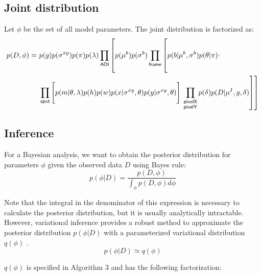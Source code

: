 \subsection*{Joint distribution}

Let $\phi$ be the set of all model parameters. The joint distribution is factorized as:
%
\begin{equation}
\begin{aligned}
    p(D, \phi) =~&p(g) p(\sigma^{xy}) p(\pi) p(\lambda) \prod_{\mathsf{AOI}} \left[ p(\mu^b) p(\sigma^b) \prod_{\mathsf{frame}} \left[ \vphantom{\prod_{F}} p(b | \mu^b, \sigma^b) p(\theta | \pi) \vphantom{\prod_{\substack{\mathsf{pixelX} \\ \mathsf{pixelY}}}} \cdot \right. \right. \\
    &\prod_{\mathsf{spot}} \left[ \vphantom{\prod_{F}} p(m | \theta, \lambda) p(h) p(w) p(x | \sigma^{xy}, \theta) p(y | \sigma^{xy}, \theta) \right] \left. \left. \prod_{\substack{\mathsf{pixelX} \\ \mathsf{pixelY}}} p(\delta) p(D | \mu^I, g, \delta) \right] \right]
\end{aligned}
\end{equation}



\subsection*{Inference}

For a Bayesian analysis, we want to obtain the posterior distribution for parameters $\phi$ given the observed data $D$ using Bayes rule:
%
\begin{equation}
    p(\phi | D) =
    \dfrac{p(D, \phi)}{\int_{\phi} p(D, \phi) d\phi}
\end{equation}

Note that the integral in the denominator of this expression is necessary to calculate the posterior distribution, but it is usually analytically intractable. However, variational inference provides a robust method to approximate the posterior distribution $p(\phi | D)$ with a parameterized variational distribution $q(\phi)$ \cite{Bishop2006-oa}.
%
\begin{equation}
    p(\phi | D) \simeq q(\phi)
\end{equation}

$q(\phi)$ is specified in Algorithm 3 and has the following factorization:


